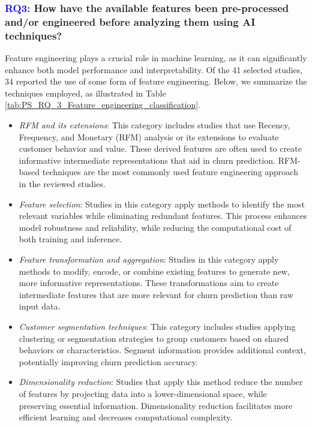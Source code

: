 \documentclass[preprint,12pt]{elsarticle}
\newcommand{\RQlabel}[1]{\textcolor{blue}{#1}}
\newcommand{\RSRQthree}{\RQlabel{RQ3}: How have the available features been pre-processed and/or engineered before analyzing them using AI techniques?}
\begin{document}
\subsubsection{\RSRQthree}
\label{sec:RQ3}
Feature engineering plays a crucial role in machine learning, as it can significantly enhance both model performance and interpretability. Of the 41 selected studies, 34 reported the use of some form of feature engineering. Below, we summarize the techniques employed, as illustrated in Table \ref{tab:PS_RQ_3_Feature_engineering_classification}.



\begin{itemize}
    \item \textit{RFM and its extensions}: This category includes studies that use Recency, Frequency, and Monetary (RFM) analysis or its extensions to evaluate customer behavior and value. These derived features are often used to create informative intermediate representations that aid in churn prediction. RFM-based techniques are the most commonly used feature engineering approach in the reviewed studies.
    
    \item \textit{Feature selection}: Studies in this category apply methods to identify the most relevant variables while eliminating redundant features.
    This process enhances model robustness and reliability, while  reducing the computational cost of both training and inference. 
    
    \item \textit{Feature transformation and aggregation}: Studies in this category apply methods to modify, encode, or combine existing features to generate new, more informative representations. These transformations aim to create intermediate features that are more relevant for churn prediction than raw input data.

    \item \textit{Customer segmentation techniques}: This category includes studies applying clustering or segmentation strategies to group customers based on shared behaviors or characteristics. Segment information provides additional context, potentially improving churn prediction accuracy.

    \item \textit{Dimensionality reduction}: Studies that apply this method reduce the number of features by projecting data into a lower-dimensional space, while preserving essential information. Dimensionality reduction facilitates more efficient learning and decreases computational complexity.
\end{itemize}
\end{document}
